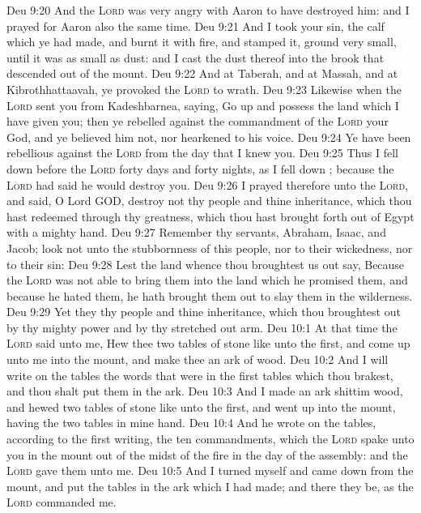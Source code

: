 \vs Deu 9:20 And the \textsc{Lord} was very angry with Aaron to have destroyed him: and I prayed for Aaron also the same time.
\vs Deu 9:21 And I took your sin, the calf which ye had made, and burnt it with fire, and stamped it,  ground  very small,  until it was as small as dust: and I cast the dust thereof into the brook that descended out of the mount.
\vs Deu 9:22 And at Taberah, and at Massah, and at Kibrothhattaavah, ye provoked the \textsc{Lord} to wrath.
\vs Deu 9:23 Likewise when the \textsc{Lord} sent you from Kadeshbarnea, saying, Go up and possess the land which I have given you; then ye rebelled against the commandment of the \textsc{Lord} your God, and ye believed him not, nor hearkened to his voice.
\vs Deu 9:24 Ye have been rebellious against the \textsc{Lord} from the day that I knew you.
\vs Deu 9:25 Thus I fell down before the \textsc{Lord} forty days and forty nights, as I fell down ; because the \textsc{Lord} had said he would destroy you.
\vs Deu 9:26 I prayed therefore unto the \textsc{Lord}, and said, O Lord GOD, destroy not thy people and thine inheritance, which thou hast redeemed through thy greatness, which thou hast brought forth out of Egypt with a mighty hand.
\vs Deu 9:27 Remember thy servants, Abraham, Isaac, and Jacob; look not unto the stubbornness of this people, nor to their wickedness, nor to their sin:
\vs Deu 9:28 Lest the land whence thou broughtest us out say, Because the \textsc{Lord} was not able to bring them into the land which he promised them, and because he hated them, he hath brought them out to slay them in the wilderness.
\vs Deu 9:29 Yet they  thy people and thine inheritance, which thou broughtest out by thy mighty power and by thy stretched out arm.
\vs Deu 10:1 At that time the \textsc{Lord} said unto me, Hew thee two tables of stone like unto the first, and come up unto me into the mount, and make thee an ark of wood.
\vs Deu 10:2 And I will write on the tables the words that were in the first tables which thou brakest, and thou shalt put them in the ark.
\vs Deu 10:3 And I made an ark  shittim wood, and hewed two tables of stone like unto the first, and went up into the mount, having the two tables in mine hand.
\vs Deu 10:4 And he wrote on the tables, according to the first writing, the ten commandments, which the \textsc{Lord} spake unto you in the mount out of the midst of the fire in the day of the assembly: and the \textsc{Lord} gave them unto me.
\vs Deu 10:5 And I turned myself and came down from the mount, and put the tables in the ark which I had made; and there they be, as the \textsc{Lord} commanded me.
